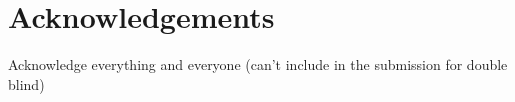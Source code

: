 \section{Acknowledgements}

Acknowledge everything and everyone (can't include in the submission for double blind)
